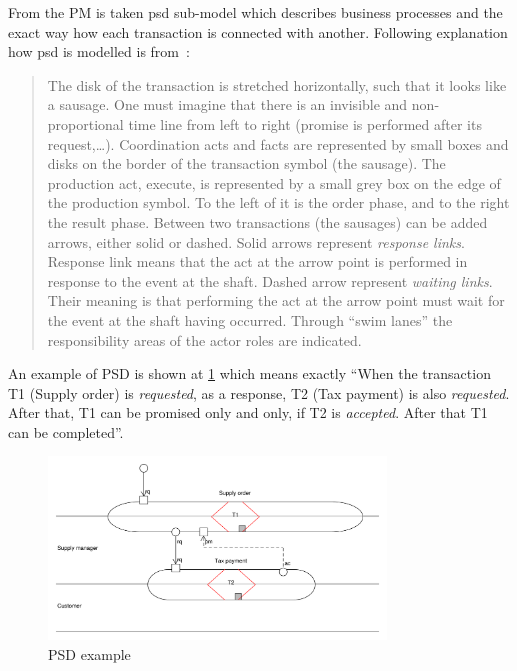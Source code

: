From the PM is taken \gls{psd} sub-model which describes business processes and the exact way how each transaction is connected with another. Following explanation how \gls{psd} is modelled is from~\cite{perinforma-essence-2015}:

\begin{quote}
      The disk of the transaction is stretched horizontally, such that it looks like a sausage. One must imagine that there is an invisible and non-proportional time line from left to right (promise is performed after its request,\dots). Coordination acts and facts are represented by small boxes and disks on the border of the transaction symbol (the sausage). 
      The production act, execute, is represented by a small grey box on the edge of the production symbol. To the left of it is the order phase, and to the right the result phase.
      Between two transactions (the sausages) can be added arrows, either solid or dashed. Solid arrows represent \textit{response links}. Response link means that the act at the arrow point is performed in response to the event at the shaft. Dashed arrow represent \textit{waiting links}. Their meaning is that performing the act at the arrow point must wait for the event at the shaft having occurred. Through ``swim lanes'' the responsibility areas of the actor roles are indicated.
\end{quote}

An example of PSD is shown at \cref{fig:psd-example} which means exactly ``When the transaction T1 (Supply order) is \textit{requested}, as a response, T2 (Tax payment) is also \textit{requested}. After that, T1 can be promised only and only, if T2 is \textit{accepted}. After that T1 can be completed''.

\begin{figure}[ht!]
	\centering
    \includegraphics[width=0.8\textwidth]{img/psd-example}
    \caption{PSD example}
    \label{fig:psd-example}
\end{figure}

